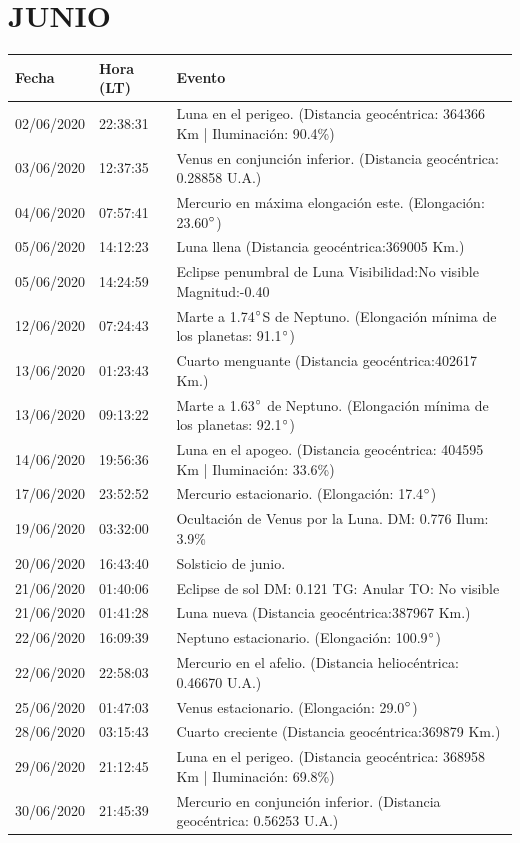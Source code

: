 \documentclass[12pt,a4paper,oneside]{article}
\begin{document}
\section{JUNIO}
\begin{center}
\begin{tabular}{ |l| l| l| }
\hline
 \textbf{Fecha} & \textbf{Hora (LT)} & \textbf{Evento}\\
 \hline
02/06/2020 &  22:38:31   &  Luna en el perigeo. (Distancia geocéntrica: 364366 Km | Iluminación: 90.4\%)	  \\
03/06/2020 &  12:37:35   &  Venus en conjunción inferior. (Distancia geocéntrica: 0.28858 U.A.)	  \\
04/06/2020 &  07:57:41   &  Mercurio en máxima elongación este. (Elongación: 23.60$\degree$)	  \\
05/06/2020 &  14:12:23   &  Luna llena (Distancia geocéntrica:369005 Km.)	  \\
05/06/2020 &  14:24:59   &  Eclipse penumbral de Luna Visibilidad:No visible Magnitud:-0.40	  \\
12/06/2020 &  07:24:43   &  Marte a 1.74$\degree$S de Neptuno. (Elongación mínima de los planetas: 91.1$\degree$)	  \\
13/06/2020 &  01:23:43   &  Cuarto menguante (Distancia geocéntrica:402617 Km.)	  \\
13/06/2020 &  09:13:22   &  Marte a 1.63$\degree$ de Neptuno. (Elongación mínima de los planetas: 92.1$\degree$)	  \\
14/06/2020 &  19:56:36   &  Luna en el apogeo. (Distancia geocéntrica: 404595 Km | Iluminación: 33.6\%)	  \\
17/06/2020 &  23:52:52   &  Mercurio estacionario. (Elongación: 17.4$\degree$)	  \\
19/06/2020 &  03:32:00   &  Ocultación de Venus por la Luna. DM: 0.776 Ilum: 3.9\%	  \\
20/06/2020 &  16:43:40   &  Solsticio de junio.  \\
21/06/2020 &  01:40:06   &  Eclipse de sol DM: 0.121 TG: Anular TO: No visible   \\
21/06/2020 &  01:41:28   &  Luna nueva (Distancia geocéntrica:387967 Km.)	  \\ 
22/06/2020 &  16:09:39   &  Neptuno estacionario. (Elongación: 100.9$\degree$)	  \\
22/06/2020 &  22:58:03   &  Mercurio en el afelio. (Distancia heliocéntrica: 0.46670 U.A.)	  \\
25/06/2020 &  01:47:03   &  Venus estacionario. (Elongación: 29.0$\degree$)	  \\
28/06/2020 &  03:15:43   &  Cuarto creciente (Distancia geocéntrica:369879 Km.)	  \\
29/06/2020 &  21:12:45   &  Luna en el perigeo. (Distancia geocéntrica: 368958 Km | Iluminación: 69.8\%)	  \\ 
30/06/2020 &  21:45:39   &  Mercurio en conjunción inferior. (Distancia geocéntrica: 0.56253 U.A.)	  \\
\hline
\end{tabular}
\end{center}
\end{document}
